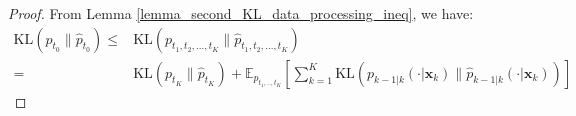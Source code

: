 \documentclass[11pt]{article}
\def\rvx{{\mathbf{x}}}
\newcommand{\E}{\mathbb{E}}
\newcommand{\KL}[2]{\mathrm{KL}\left(#1 \big\| #2\right)}
\newtheorem{theorem}[lemma]{Theorem}
\begin{document}



\begin{proof}

From {Lemma \ref{lemma_second_KL_data_processing_ineq}}, we have:
\begin{align*}
    \KL{{p}_{t_0}}{\hat{p}_{t_0}}
    \leq & \KL{{p}_{t_1, t_2, ..., t_{K}}}{\hat{p}_{t_1, t_2, ..., t_{K}}}\\
    =& \KL{{p}_{t_K}}{\hat{p}_{t_K}} + 
   \E_{{p}_{t_1,..,t_{K}}} \left[ \sum_{k=1}^K
       \KL{{p}_{k-1|k}(\cdot|{\rvx}_{k})}{\hat{p}_{k-1|k}(\cdot|{\rvx}_k)}\right]
\end{align*}


\end{proof}
\end{document}
